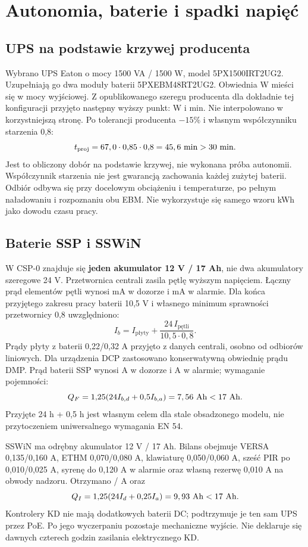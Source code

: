 \section{Autonomia, baterie i spadki napięć}
\subsection{UPS na podstawie krzywej producenta}
Wybrano UPS Eaton o mocy 1500 VA / 1500 W, model 5PX1500IRT2UG2. Uzupełniają go dwa moduły baterii 5PXEBM48RT2UG2. Obwiednia \UPSDesign{} W mieści się w mocy wyjściowej. Z opublikowanego szeregu producenta dla dokładnie tej konfiguracji przyjęto następny wyższy punkt: \UPSCurveW{} W i \UPSCurveMin{} min. Nie interpolowano w korzystniejszą stronę. Po tolerancji producenta $-15\%$ i własnym współczynniku starzenia 0,8:
\[
t_{\mathrm{proj}}=\UPSCurveMin{}\cdot0{,}85\cdot0{,}8=\UPSMinutes{}\ \mathrm{min}>30\ \mathrm{min}.
\]
Jest to obliczony dobór na podstawie krzywej, nie wykonana próba autonomii. Współczynnik starzenia nie jest gwarancją zachowania każdej zużytej baterii. Odbiór odbywa się przy docelowym obciążeniu i temperaturze, po pełnym naładowaniu i rozpoznaniu obu EBM. Nie wykorzystuje się samego wzoru kWh jako dowodu czasu pracy.\cite{S-UPS,S-UPS-GUIDE}

\subsection{Baterie SSP i SSWiN}
W CSP-0 znajduje się \textbf{jeden akumulator 12 V / 17 Ah}, nie dwa akumulatory szeregowe 24 V. Przetwornica centrali zasila pętlę wyższym napięciem. Łączny prąd elementów pętli wynosi \LoopStandbyMA{} mA w dozorze i \LoopAlarmMA{} mA w alarmie. Dla końca przyjętego zakresu pracy baterii 10,5 V i własnego minimum sprawności przetwornicy 0,8 uwzględniono:
\[
I_b=I_{\text{płyty}}+\frac{24\,I_{\text{pętli}}}{10{,}5\cdot0{,}8}.
\]
Prądy płyty z baterii 0,22/0,32 A przyjęto z danych centrali, osobno od odbiorów liniowych. Dla urządzenia DCP zastosowano konserwatywną obwiednię prądu DMP. Prąd baterii SSP wynosi \FireStandby{} A w dozorze i \FireAlarm{} A w alarmie; wymaganie pojemności:
\[
Q_F=1{,}25(24 I_{b,d}+0{,}5 I_{b,a})=\FireAh{}\ \mathrm{Ah}<17\ \mathrm{Ah}.
\]
Przyjęte 24 h + 0,5 h jest własnym celem dla stale obsadzonego modelu, nie przytoczeniem uniwersalnego wymagania EN 54.\cite{S-FIRE,S-DMP,S-ROP,S-SND}

SSWiN ma odrębny akumulator 12 V / 17 Ah. Bilans obejmuje VERSA 0,135/0,160 A, ETHM 0,070/0,080 A, klawiaturę 0,050/0,060 A, sześć PIR po 0,010/0,025 A, syrenę do 0,120 A w alarmie oraz własną rezerwę 0,010 A na obwody nadzoru. Otrzymano \IntrusionStandby{}/\IntrusionAlarm{} A oraz
\[
Q_I=1{,}25(24 I_d+0{,}25 I_a)=\IntrusionAh{}\ \mathrm{Ah}<17\ \mathrm{Ah}.
\]
Kontrolery KD nie mają dodatkowych baterii DC; podtrzymuje je ten sam UPS przez PoE. Po jego wyczerpaniu pozostaje mechaniczne wyjście. Nie deklaruje się dawnych czterech godzin zasilania elektrycznego KD.\cite{S-SSWIN,S-ETHM,S-LCD,S-PIR,S-SIREN}

